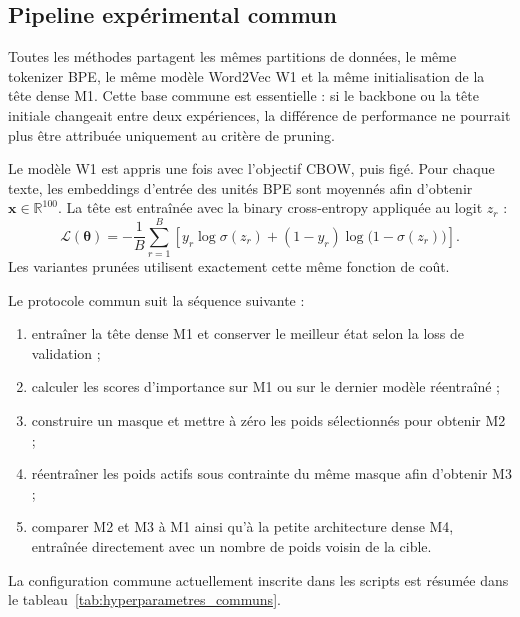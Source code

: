 
\subsection{Pipeline expérimental commun}
\label{ssec:methode_pipeline}

Toutes les méthodes partagent les mêmes partitions de données, le même
tokenizer BPE, le même modèle Word2Vec W1 et la même initialisation de la tête
dense M1. Cette base commune est essentielle : si le backbone ou la tête
initiale changeait entre deux expériences, la différence de performance ne
pourrait plus être attribuée uniquement au critère de pruning.

Le modèle W1 est appris une fois avec l'objectif CBOW, puis figé. Pour chaque
texte, les embeddings d'entrée des unités BPE sont moyennés afin d'obtenir
$\boldsymbol{x}\in\mathbb{R}^{100}$. La tête est entraînée avec la
binary cross-entropy appliquée au logit $z_r$ :
\begin{equation}
    \mathcal{L}(\boldsymbol{\theta})
    =-\frac{1}{B}\sum_{r=1}^{B}
    \left[
        y_r\log\sigma(z_r)
        +(1-y_r)\log\bigl(1-\sigma(z_r)\bigr)
    \right].
    \label{eq:loss_bce_methodologie}
\end{equation}
Les variantes prunées utilisent exactement cette même fonction de coût.

Le protocole commun suit la séquence suivante :
\begin{enumerate}
    \item entraîner la tête dense M1 et conserver le meilleur état selon la
    loss de validation ;
    \item calculer les scores d'importance sur M1 ou sur le dernier modèle
    réentraîné ;
    \item construire un masque et mettre à zéro les poids sélectionnés pour
    obtenir M2 ;
    \item réentraîner les poids actifs sous contrainte du même masque afin
    d'obtenir M3 ;
    \item comparer M2 et M3 à M1 ainsi qu'à la petite architecture dense M4,
    entraînée directement avec un nombre de poids voisin de la cible.
\end{enumerate}

La configuration commune actuellement inscrite dans les scripts est résumée
dans le tableau~\ref{tab:hyperparametres_communs}.

